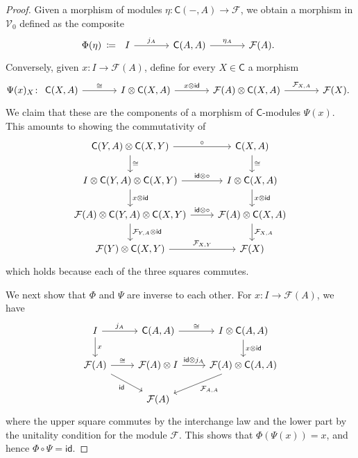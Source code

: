 \documentclass[11pt,onecolumn]{article}
\newcommand{\id}{\mathsf{id}}
\newcommand{\cV}{\mathscr{V}}
\newcommand{\cC}{\mathsf{C}}
\theoremstyle{plain}
\theoremstyle{remark}
\theoremstyle{definition}
\begin{document}
\begin{proof}
	Given a morphism of modules $\eta \colon \cC(-, A) \to \mathcal{F}$, we obtain a morphism in $\cV_0$ defined as the composite
	\[
		\Phi(\eta) \:\coloneqq\:
		\begin{tikzcd}[column sep=large, baseline=(current bounding box.center)]
			I \ar[r, "j_A"] & \cC(A, A) \ar[r, "\eta_A"] & \mathcal{F}(A).
		\end{tikzcd}
	\]
	Conversely, given $x \colon I \to \mathcal{F}(A)$, define for every $X \in \cC$ a morphism
	\[
		\Psi(x)_X \colon
		\begin{tikzcd}[column sep=large]
			\cC(X, A) \ar[r, "\cong"] & I \otimes \cC(X, A) \ar[r, "x \otimes \id"] & \mathcal{F}(A) \otimes \cC(X, A) \ar[r, "\mathcal{F}_{X, A}"] & \mathcal{F}(X).
		\end{tikzcd}
	\]
	We claim that these are the components of a morphism of $\cC$-modules $\Psi(x)$.
	This amounts to showing the commutativity of
	\[
		\begin{tikzcd}
			\cC(Y, A) \otimes \cC(X, Y) \ar[r, "\circ"] \ar[d, "\cong"] & \cC(X, A) \ar[d, "\cong"] \\
			I \otimes \cC(Y, A) \otimes \cC(X, Y) \ar[r, "\id \otimes \circ"] \ar[d, "x \otimes \id"]  & I \otimes \cC(X, A) \ar[d, "x \otimes \id"] \\
			\mathcal{F}(A) \otimes \cC(Y, A) \otimes \cC(X, Y) \ar[r, "\id \otimes \circ"] \ar[d, "\mathcal{F}_{Y,A} \otimes \id"] & \mathcal{F}(A) \otimes \cC(X, A) \ar[d, "\mathcal{F}_{X, A}"] \\
			\mathcal{F}(Y) \otimes \cC(X, Y) \ar[r, "\mathcal{F}_{X, Y}"] & \mathcal{F}(X)
		\end{tikzcd}
	\]
	which holds because each of the three squares commutes.

	We next show that $\Phi$ and $\Psi$ are inverse to each other.
	For $x \colon I \to \mathcal{F}(A)$, we have
	\[
		\begin{tikzcd}
			I \ar[r, "j_A"] \ar[d, "x"] & \cC(A, A) \ar[r, "\cong"] & I \otimes \cC(A, A) \ar[d, "x \otimes \id"] \\
			\mathcal{F}(A) \ar[dr, "\id"'] \ar[r, "\cong"]	     & \mathcal{F}(A) \otimes I \ar[r, "\id \otimes j_A"] & \mathcal{F}(A) \otimes \cC(A, A) \ar[dl, "\mathcal{F}_{A, A}"] \\
									     & \mathcal{F}(A) 
		\end{tikzcd}
	\]
	where the upper square commutes by the interchange law and the lower part by the unitality condition for the module $\mathcal{F}$.
	This shows that $\Phi(\Psi(x)) = x$, and hence $\Phi \circ \Psi = \id$.


\end{proof}
\end{document}
